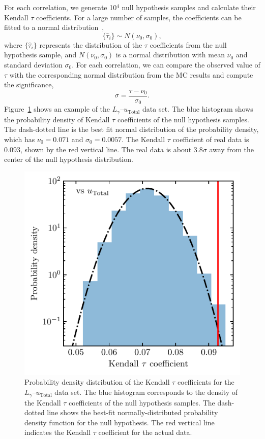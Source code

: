 \documentclass[doublespace,nopageskip]{VTthesis} %
\begin{document}
For each correlation, we generate 10$^4$ null hypothesis samples and calculate their Kendall $\tau$ coefficients. For a large number of samples, the coefficients can be fitted to a normal distribution~\citep{10.2307/2669997},
\begin{equation}
    \{\hat{\tau}_i\} \sim N(\nu_0,\sigma_0),
\end{equation}
where $\{\hat{\tau}_i\}$ represents the distribution of the $\tau$ coefficients from the null hypothesis sample, and $N(\nu_0,\sigma_0)$ is a normal distribution with mean $\nu_0$ and standard deviation $\sigma_0$. For each correlation, we can compare the observed value of $\tau$ with the corresponding normal distribution from the MC results and compute the significance,
\begin{equation}
    \sigma = \frac{\tau - \nu_0}{\sigma_0}.
\end{equation}
Figure~\ref{fig:hist} shows an example of the $L_\gamma$--$u_\mathrm{Total}$ data set. The blue histogram shows the probability density of Kendall $\tau$ coefficients of the null hypothesis samples. The dash-dotted line is the best fit normal distribution of the probability density, which has $\nu_0 = 0.071$ and $\sigma_0 = 0.0057$. The Kendall $\tau$ coefficient of real data is 0.093, shown by the red vertical line. The real data is about 3.8$\sigma$ away from the center of the null hypothesis distribution.

\begin{figure}
    \centering
    \includegraphics[width=\columnwidth]{Figures/Globular/hist_urad.pdf}
    \caption{ Probability density distribution of the Kendall $\tau$ coefficients for the $L_\gamma$--$u_\mathrm{Total}$ data set. The blue histogram %
    corresponds to the density of the Kendall $\tau$ coefficients of the null hypothesis samples. The dash-dotted line shows the best-fit normally-distributed probability density function for the null hypothesis. The red vertical line indicates the Kendall $\tau$ coefficient for the %
    actual data.}
    \label{fig:hist}
\end{figure}
\end{document}
